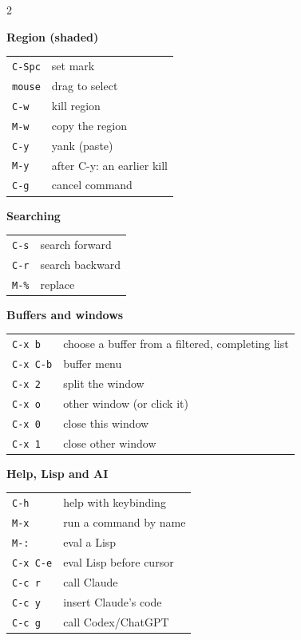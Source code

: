 \documentclass[a4paper,12pt,openany]{book}
\begin{document}
\begin{multicols}{2}
\columnbreak

\textbf{Region (shaded)}\\[1pt]
{\large
\begin{tabular}{@{}>{\raggedright}p{2.35cm}@{\,}p{6.1cm}@{}}
\texttt{C-Spc} & set mark\\
\texttt{mouse} & drag to select\\
\texttt{C-w} & kill  region\\
\texttt{M-w} & copy the region\\
\texttt{C-y} & yank (paste)\\
\texttt{M-y} & after C-y: an earlier kill\\
\texttt{C-g} & cancel command\\
\end{tabular}}
\vspace{7pt}

\textbf{Searching}\\[1pt]
{\large
\begin{tabular}{@{}>{\raggedright}p{2.35cm}@{\,}p{6.1cm}@{}}
\texttt{C-s} & search forward\\
\texttt{C-r} & search backward\\
\texttt{M-\%} & replace\\
\end{tabular}}
\vspace{7pt}

\textbf{Buffers and windows}\\[1pt]
{\large
\begin{tabular}{@{}>{\raggedright}p{2.35cm}@{\,}p{6.1cm}@{}}
\texttt{C-x b} & choose a buffer from a filtered, completing list\\
\texttt{C-x C-b} & buffer menu\\
\texttt{C-x 2} & split the window\\
\texttt{C-x o} & other window (or click it)\\
\texttt{C-x 0} & close this  window\\
\texttt{C-x 1} & close other window\\
\end{tabular}}
\vspace{7pt}

\textbf{Help, Lisp and AI}\\[1pt]
{\large
\begin{tabular}{@{}>{\raggedright}p{2.35cm}@{\,}p{6.1cm}@{}}
\texttt{C-h} & help with keybinding\\
\texttt{M-x} & run a command by name\\
\texttt{M-:} & eval a Lisp \\
\texttt{C-x C-e} & eval Lisp before cursor\\
\texttt{C-c r} & call Claude\\
\texttt{C-c y} & insert Claude's code\\
\texttt{C-c g} & call Codex/ChatGPT\\
\end{tabular}}
\vspace{7pt}

\end{multicols}
\vspace{-6pt}
\restoregeometry
\clearpage
\tableofcontents
\mainmatter
\end{document}
